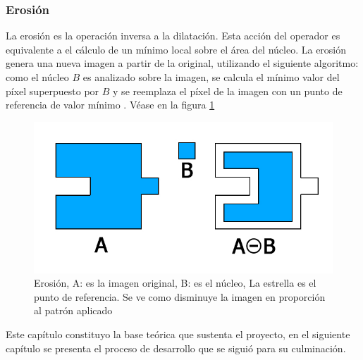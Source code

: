 \subsubsection{Erosión}
La erosión es la operación inversa a la dilatación. Esta acción del operador es equivalente a el cálculo de un mínimo local sobre el área del núcleo. La erosión genera una nueva imagen a partir de la original, utilizando el siguiente algoritmo: como el núcleo $B$ es analizado sobre la imagen, se calcula el mínimo valor del píxel superpuesto por $B$ y se reemplaza el píxel de la imagen con un punto de referencia de valor mínimo \cite{BookOpenCv}. 
V\'ease en la figura \ref{fig:erosion}

\begin{figure}[hbtp]
\centering
\includegraphics[scale=0.3]{imagenes/erosion.jpg}
\caption{Erosión,  A: es la imagen original, B: es el n\'ucleo, La estrella es el punto de referencia. Se ve como disminuye la imagen en proporci\'on al patr\'on aplicado}
\label{fig:erosion}
\end{figure}

Este cap\'itulo constituyo la base te\'orica que sustenta el proyecto, en el siguiente cap\'itulo se presenta el proceso de desarrollo que se sigui\'o para su culminaci\'on. 
